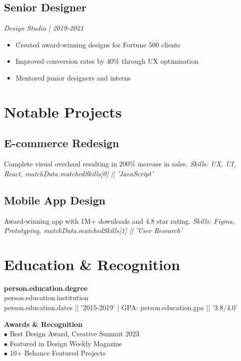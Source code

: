 \documentclass[10pt,a4paper]{article}
\newcommand{\coloredicon}[1]{{\color{primary}\faIcon{#1}}}
\begin{document}
\begin{multicols}{2}
\subsection{\coloredicon{briefcase} Senior Designer}
\textit{Design Studio | 2019-2021}
\begin{itemize}[leftmargin=*, topsep=0pt, itemsep=2pt]
    \item Created award-winning designs for Fortune 500 clients
    \item Improved conversion rates by 40\% through UX optimization
    \item Mentored junior designers and interns
\end{itemize}

\section{Notable Projects}

\subsection{\coloredicon{star} E-commerce Redesign}
Complete visual overhaul resulting in 200\% increase in sales.
\textit{Skills: UX, UI, React, {{matchData.matchedSkills[0] || 'JavaScript'}}}

\subsection{\coloredicon{star} Mobile App Design}
Award-winning app with 1M+ downloads and 4.8 star rating.
\textit{Skills: Figma, Prototyping, {{matchData.matchedSkills[1] || 'User Research'}}}

\end{multicols}

\vspace{0.5em}
\section{Education \& Recognition}

\noindent
\begin{minipage}[t]{0.48\textwidth}
    \textbf{{{person.education.degree}}}\\
    {{person.education.institution}}\\
    {{person.education.dates || '2015-2019'}} | GPA: {{person.education.gpa || '3.8/4.0'}}
\end{minipage}
\hfill
\begin{minipage}[t]{0.48\textwidth}
    \textbf{Awards \& Recognition}\\
    $\bullet$ Best Design Award, Creative Summit 2023\\
    $\bullet$ Featured in Design Weekly Magazine\\
    $\bullet$ 10+ Behance Featured Projects
\end{minipage}

\vspace{1em}
\begin{center}
\end{center}
\end{document}
